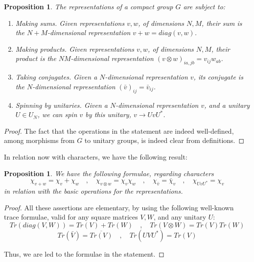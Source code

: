 \documentclass[12pt]{amsbook}
\newtheorem{proposition}[theorem]{Proposition}
\begin{document}

\begin{proposition}
The representations of a compact group $G$ are subject to:
\begin{enumerate}
\item Making sums. Given representations $v,w$, of dimensions $N,M$, 
their sum is the $N+M$-dimensional representation $v+w=diag(v,w)$.

\item Making products. Given representations $v,w$, of dimensions $N,M$, their product is the $NM$-dimensional representation $(v\otimes w)_{ia,jb}=v_{ij}w_{ab}$.

\item Taking conjugates. Given a $N$-dimensional representation $v$, its conjugate is the $N$-dimensional representation $(\bar{v})_{ij}=\bar{v}_{ij}$.

\item Spinning by unitaries. Given a $N$-dimensional representation $v$, and a unitary $U\in U_N$, we can spin $v$ by this unitary, $v\to UvU^*$.
\end{enumerate}
\end{proposition}

\begin{proof}
The fact that the operations in the statement are indeed well-defined, among morphisms from $G$ to unitary groups, is indeed clear from definitions.
\end{proof}

In relation now with characters, we have the following result:

\begin{proposition}
We have the following formulae, regarding characters
$$\chi_{v+w}=\chi_v+\chi_w\quad,\quad 
\chi_{v\otimes w}=\chi_v\chi_w\quad,\quad 
\chi_{\bar{v}}=\bar{\chi}_v\quad,\quad
\chi_{UvU^*}=\chi_v$$
in relation with the basic operations for the representations.
\end{proposition}

\begin{proof}
All these assertions are elementary, by using the following well-known trace formulae, valid for any square matrices $V,W$, and any unitary $U$:
$$Tr(diag(V,W))=Tr(V)+Tr(W)\quad,\quad 
Tr(V\otimes W)=Tr(V)Tr(W)$$
$$Tr(\bar{V})=\overline{Tr(V)}\quad,\quad 
Tr(UVU^*)=Tr(V)$$

Thus, we are led to the formulae in the statement.
\end{proof}
\end{document}
